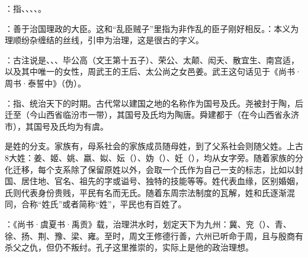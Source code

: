 {
\item {}：指、、、、。
\item {}：善于治国理政的大臣。这和“乱臣贼子”里指为非作乱的臣子刚好相反。：本义为理顺纷杂缠结的丝线，引申为治理，这是很古的字义。

：古注说是、、、毕公高（文王第十五子）、荣公、太颠、闳夭、散宜生、南宫适，以及其中唯一的女性，周武王的王后、太公尚之女邑姜。武王这句话见于《尚书·周书·泰誓中》（伪）。

\item {}：指、统治天下的时期。古代常以建国之地的名称作为国号及氏。尧被封于陶，后迁至（今山西省临汾市一带），其国号及氏均为陶唐。舜建都于（在今山西省永济市），其国号及氏均为有虞。%

是姓的分支。家族有，母系社会的家族成员随母姓，到了父系社会则随父姓。上古8大姓：姜、姬、姚、嬴、姒、妘（）、妫（）、妊（），均从女字旁。随着家族的分化迁移，每个支系除了保留原姓以外，会取一个氏作为自己一支的标志，比如以封国、居住地、官名、祖先的字或谥号、独特的技能等等。姓代表血缘，区别婚姻，氏则代表身份贵贱，平民有名而无氏。随着东周宗法制度的瓦解，姓和氏逐渐混同，合称“姓氏”或者简称“姓”，平民也有百姓了。

\item {}：《尚书·虞夏书·禹贡》载，治理洪水时，划定天下为九州：冀、兖（）、青、徐、扬、荆、豫、梁、雍。至时，周文王修德行善，六州已听命于周，且与殷商有杀父之仇，但仍不叛纣。孔子这里推崇的，实际上是他的政治理想。

}
